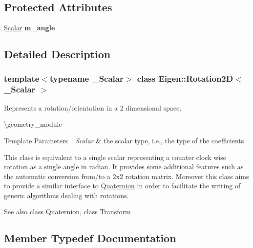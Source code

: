 \subsection*{Protected Attributes}
\begin{DoxyCompactItemize}
\item 
\mbox{\label{class_eigen_1_1_rotation2_d_afd858dda7a5605f17c6dee8f216cef8b}} 
\mbox{\hyperlink{class_eigen_1_1_rotation2_d_ac20c665ece0f197a712a2a39ae72e4e4}{Scalar}} {\bfseries m\+\_\+angle}
\end{DoxyCompactItemize}


\subsection{Detailed Description}
\subsubsection*{template$<$typename \+\_\+\+Scalar$>$\newline
class Eigen\+::\+Rotation2\+D$<$ \+\_\+\+Scalar $>$}

Represents a rotation/orientation in a 2 dimensional space. 

\textbackslash{}geometry\+\_\+module


\begin{DoxyTemplParams}{Template Parameters}
{\em \+\_\+\+Scalar} & the scalar type, i.\+e., the type of the coefficients\\
\hline
\end{DoxyTemplParams}
This class is equivalent to a single scalar representing a counter clock wise rotation as a single angle in radian. It provides some additional features such as the automatic conversion from/to a 2x2 rotation matrix. Moreover this class aims to provide a similar interface to \mbox{\hyperlink{class_eigen_1_1_quaternion}{Quaternion}} in order to facilitate the writing of generic algorithms dealing with rotations.

\begin{DoxySeeAlso}{See also}
class \mbox{\hyperlink{class_eigen_1_1_quaternion}{Quaternion}}, class \mbox{\hyperlink{class_eigen_1_1_transform}{Transform}} 
\end{DoxySeeAlso}


\subsection{Member Typedef Documentation}
\mbox{\label{class_eigen_1_1_rotation2_d_ac20c665ece0f197a712a2a39ae72e4e4}} 

